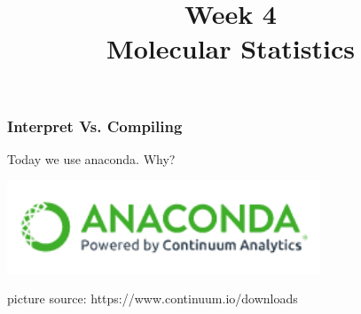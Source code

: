 
\usepackage{amsmath}
\usepackage{animate}
\usepackage{soul}

\title[]{Week 4\\Molecular Statistics}








{
\usebackgroundtemplate{}
\begin{frame}[plain]
    \titlepage
    \addtocounter{framenumber}{-1}
\end{frame}
}

%
%
%
%
%
%
%
%
%

\begin{frame}[fragile]
    \frametitle{Interpret Vs. Compiling}

    \centering

    Today we use anaconda. Why?

 \includegraphics[width=0.7\textwidth]{images/anaconda.png}

%
%
%

    {
        \scriptsize
        picture source: https://www.continuum.io/downloads}

\end{frame}


